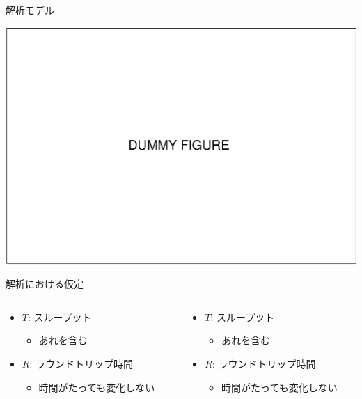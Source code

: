 \documentclass[compress,dvipdfmx,11pt]{beamer}
\begin{document}
\begin{frame}[label={sec:orga6a5bb4}]{解析モデル}
\begin{center}
\begin{center}
\includegraphics[width=\columnwidth]{./figure/dummy.eps}
\end{center}
\end{center}
\end{frame}

\begin{frame}[label={sec:orgf7be54e}]{解析における仮定}
\begin{columns}
\begin{column}{0.5\columnwidth}
\begin{itemize}
\item \(T\): スループット
\begin{itemize}
\item あれを含む
\end{itemize}
\item \(R\): ラウンドトリップ時間
\begin{itemize}
\item 時間がたっても変化しない
\end{itemize}
\end{itemize}
\end{column}

\begin{column}{0.5\columnwidth}
\begin{itemize}
\item \(T\): スループット
\begin{itemize}
\item あれを含む
\end{itemize}
\item \(R\): ラウンドトリップ時間
\begin{itemize}
\item 時間がたっても変化しない
\end{itemize}
\end{itemize}
\end{column}
\end{columns}
\end{frame}
\end{document}
